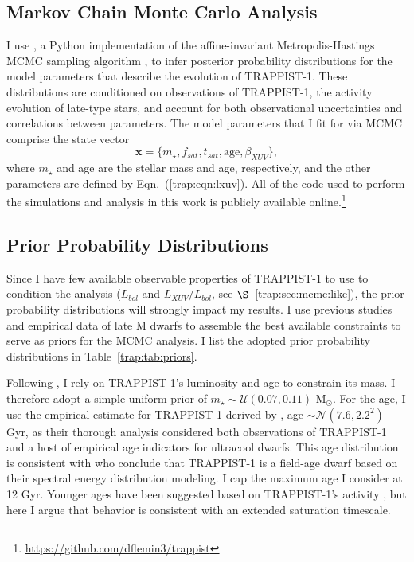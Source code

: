 
\subsection{Markov Chain Monte Carlo Analysis} \label{trap:sec:mcmc}

I use \emcee, a Python implementation of the affine-invariant Metropolis-Hastings MCMC sampling algorithm \citep{ForemanMackey2013}, to infer posterior probability distributions for the model parameters that describe the evolution of TRAPPIST-1. These distributions are conditioned on observations of TRAPPIST-1, the activity evolution of late-type stars, and account for both observational uncertainties and correlations between parameters. The model parameters that I fit for via MCMC comprise the state vector
\begin{equation} \label{trap:eqn:state}
    \textbf{x} = \{m_{\star}, f_{sat}, t_{sat}, \mathrm{age}, \beta_{XUV}\},
\end{equation}
where $m_{\star}$ and age are the stellar mass and age, respectively, and the other parameters are defined by Eqn.~(\ref{trap:eqn:lxuv}). All of the code used to perform the simulations and analysis in this work is publicly available online.\footnote{ \href{https://github.com/dflemin3/trappist}{https://github.com/dflemin3/trappist}}

\subsection{Prior Probability Distributions} \label{trap:sec:mcmc:priors}

Since I have few available observable properties of TRAPPIST-1 to use to condition the analysis ($L_{bol}$ and $L_{XUV}/L_{bol}$, see $\S$~\ref{trap:sec:mcmc:like}), the prior probability distributions will strongly impact my results. I use previous studies and empirical data of late M dwarfs to assemble the best available constraints to serve as priors for the MCMC analysis. I list the adopted prior probability distributions in Table~\ref{trap:tab:priors}.

Following \citet{vanGrootel2018}, I rely on TRAPPIST-1's luminosity and age to constrain its mass. I therefore adopt a simple uniform prior of $m_{\star} \sim \mathcal{U}(0.07, 0.11)$ M$_{\odot}$. For the age, I use the empirical estimate for TRAPPIST-1 derived by \citet{Burgasser2017}, age $\sim \mathcal{N}(7.6, 2.2^2)$ Gyr, as their thorough analysis considered both observations of TRAPPIST-1 and a host of empirical age indicators for ultracool dwarfs. This age distribution is consistent with \citet{Gonzales2019} who conclude that TRAPPIST-1 is a field-age dwarf based on their spectral energy distribution modeling. I cap the maximum age I consider at 12 Gyr. Younger ages have been suggested based on TRAPPIST-1's activity \citep[e.g.~$\gsim 500$ Myr,][]{Bourrier2017b}, but here I argue that behavior is consistent with an extended saturation timescale.


